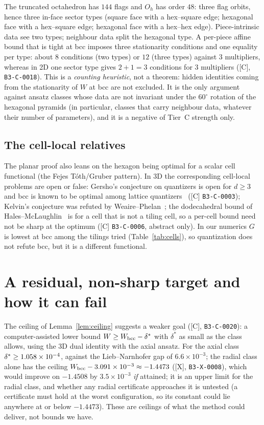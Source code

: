 \documentclass[10pt]{article}
\newcommand{\tier}[1]{\textsf{[#1]}}
\newcommand{\cid}[1]{\texttt{B3-#1}}
\theoremstyle{remark}
\begin{document}
The truncated octahedron has $144$ flags and $O_h$ has order $48$: three flag orbits, hence three in-face sector types (square face with a hex--square edge; hexagonal face with a hex--square edge; hexagonal face with a hex--hex edge). Piece-intrinsic data see two types; neighbour data split the hexagonal type.
A per-piece affine bound that is tight at bcc imposes three stationarity conditions and one equality per type: about $8$ conditions (two types) or $12$ (three types) against $3$ multipliers, whereas in 2D one sector type gives $2+1=3$ conditions for $3$ multipliers
(\tier{C}, \cid{C-0018}). This is a \emph{counting heuristic}, not a theorem: hidden identities coming from the stationarity of $W$ at bcc are not excluded. It is the only argument against ansatz classes whose data are not invariant under the $60^\circ$ rotation of the hexagonal pyramids (in particular, classes that carry neighbour data, whatever their number of parameters), and it is a negative of Tier~C strength only.

\subsection{The cell-local relatives}\label{sec:cells}
The planar proof also leans on the hexagon being optimal for a scalar cell functional (the Fejes T\'oth/Gruber pattern). In 3D the corresponding cell-local problems are open or false:
Gersho's conjecture on quantizers is open for $d\ge3$ and bcc is known to be optimal among lattice quantizers~\cite{ai} (\tier{C} \cid{C-0003}); Kelvin's conjecture was refuted by Weaire--Phelan~\cite{ai}; the dodecahedral bound of Hales--McLaughlin~\cite{hm} is for a cell that is not a tiling cell, so a per-cell bound need not be sharp at the optimum (\tier{C} \cid{C-0006}, abstract only).
In our numerics $G$ is lowest at bcc among the tilings tried (Table~\ref{tab:cells}), so quantization does not refute bcc, but it is a different functional.

\section{A residual, non-sharp target and how it can fail}\label{sec:plan}
The ceiling of Lemma~\ref{lem:ceiling} suggests a weaker goal (\tier{C}, \cid{C-0020}): a computer-assisted lower bound $W\ge W_{\rm bcc}-\delta^*$ with $\delta^*$ as small as the class allows, using the 3D dual identity with the axial ansatz. For the axial class $\delta^*\ge1.058\times10^{-4}$, against the Lieb--Narnhofer gap of $6.6\times10^{-3}$; the radial class alone has the ceiling $W_{\rm bcc}-3.091\times10^{-3}\approx-1.4473$ (\tier{X}, \cid{X-0008}), which would improve on $-1.4508$ by $3.5\times10^{-3}$ \emph{if} attained; it is an upper limit for the radial class, and whether any radial certificate approaches it is untested (a certificate must hold at the worst configuration, so its constant could lie anywhere at or below $-1.4473$). These are ceilings of what the method could deliver, not bounds we have.
\end{document}
